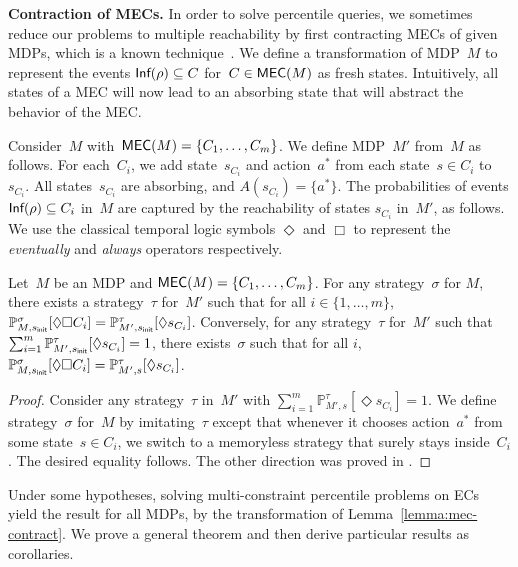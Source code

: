 \documentclass{llncs}
\newcommand{\initState}{\ensuremath{s_{{\sf init}}} }
\newcommand*{\pr}{\mathbb{P}}
\newcommand{\Inf}{\textrm{\sf Inf}}
\newcommand\mecs{\ensuremath{\textrm{\sf MEC}}}
\begin{document}
\smallskip\noindent\textbf{Contraction of MECs.} In order to solve percentile queries, we sometimes reduce our problems to multiple reachability by first contracting MECs of given MDPs,
which is a known technique~\cite{DeAlfaro-phd97}. We define a transformation of MDP~$M$ to represent the events $\Inf(\rho) \subseteq C$ for~$C \in \mecs(M)$
as fresh states. Intuitively, all states of a MEC will now lead to an absorbing state that will abstract the behavior of the MEC.

Consider~$M$ with~$\mecs(M)=\{C_1,\ldots,C_m\}$. We define MDP~$M'$ from~$M$ as follows. For each~$C_i$, we add state~$s_{C_i}$ and action~$a^*$ from each state~$s \in C_i$ to~$s_{C_i}$.
All states~$s_{C_i}$ are absorbing, and $A(s_{C_i}) = \{a^*\}$. 
The probabilities of events $\Inf(\rho) \subseteq C_i$ in~$M$ are captured by the reachability of states $s_{C_i}$ in~$M'$, as follows. We use the classical temporal logic symbols $\Diamond$ and $\Box$ to represent the \textit{eventually} and \textit{always} operators respectively.

\begin{lemma}
  \label{lemma:mec-contract}
	Let~$M$ be an MDP and $\mecs(M)=\{C_1,\ldots,C_m\}$. For any strategy~$\sigma$ for $M$, there exists a strategy~$\tau$ for~$M'$ such that
  for all $i\in\{1,\ldots,m\}$, $\pr_{M,\initState}^\sigma[\Diamond\Box C_i] =
	\pr_{M',\initState}^\tau[\Diamond s_{C_i}]$. 
  Conversely, for any strategy~$\tau$ for~$M'$ such that $\sum_{i=1}^m
	\pr_{M',\initState}^\tau[\Diamond s_{C_i}]=1$, there exists~$\sigma$
  such that for all
  $i$, $\pr_{M,\initState}^\sigma[\Diamond\Box C_i] = \pr_{M',s}^\tau[\Diamond s_{C_i}]$. 
\end{lemma}

\begin{proof}
  Consider any strategy~$\tau$ in~$M'$ with $\sum_{i=1}^m \pr_{M',s}^\tau[\Diamond s_{C_i}]=1$.
  We define strategy~$\sigma$ for~$M$ by imitating~$\tau$ except that whenever it chooses action~$a^*$ from some state~$s \in C_i$, we switch 
  to a memoryless strategy that surely stays inside~$C_i$. The desired equality follows. The other direction was proved in \cite[Lemma 4.6]{BBCFK-lmcs14}.
\end{proof}

Under some hypotheses, solving multi-constraint percentile problems on ECs
yield the result for all MDPs, by  the transformation of Lemma~\ref{lemma:mec-contract}.
We prove a general theorem and then derive particular results as corollaries.
\end{document}
